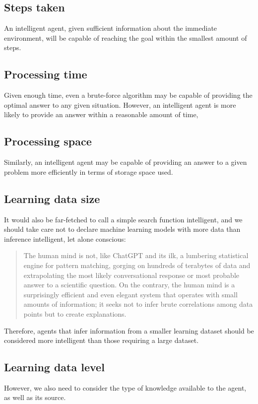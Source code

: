 \documentclass[masterthesis]{fer}
\begin{document}
\subsection{Steps taken}
An intelligent agent, given sufficient information about the immediate environment, will be capable of reaching the goal within the smallest amount of steps.
\subsection{Processing time}
Given enough time, even a brute-force algorithm may be capable of providing the optimal answer to any given situation. However, an intelligent agent is more likely to provide an answer within a reasonable amount of time, 
\subsection{Processing space}
Similarly, an intelligent agent may be capable of providing an answer to a given problem more efficiently in terms of storage space used.
\subsection{Learning data size}
It would also be far-fetched to call a simple search function intelligent, and we should take care not to declare machine learning models with more data than inference intelligent, let alone conscious:

\begin{quote}
The human mind is not, like ChatGPT and its ilk, a lumbering statistical engine for pattern matching, gorging on hundreds of terabytes of data and extrapolating the most likely conversational response or most probable answer to a scientific question. On the contrary, the human mind is a surprisingly efficient and even elegant system that operates with small amounts of information; it seeks not to infer brute correlations among data points but to create explanations. 
\cite{Chomsky2023}
\end{quote}

Therefore, agents that infer information from a smaller learning dataset should be considered more intelligent than those requiring a large dataset.
\subsection{Learning data level}
However, we also need to consider the type of knowledge available to the agent, as well as its source.
\end{document}
